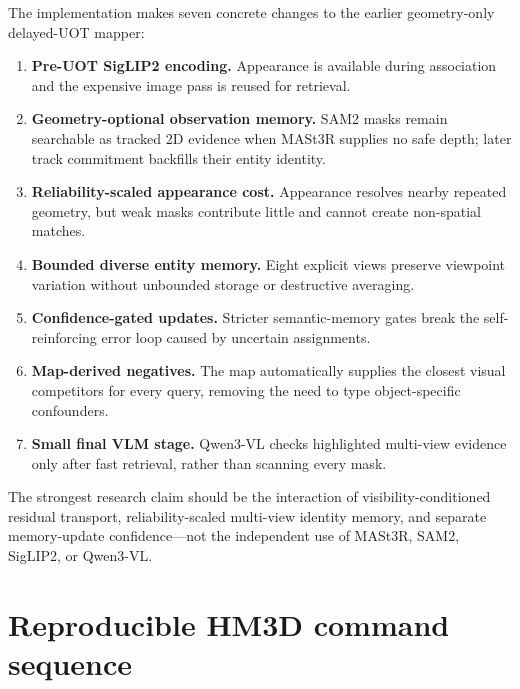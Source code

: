 \documentclass[11pt]{article}
\newcommand{\1}{\bm{1}}
\begin{document}
The implementation makes seven concrete changes to the earlier geometry-only
delayed-UOT mapper:
\begin{enumerate}[leftmargin=*]
    \item \textbf{Pre-UOT SigLIP2 encoding.} Appearance is available during
          association and the expensive image pass is reused for retrieval.
    \item \textbf{Geometry-optional observation memory.} SAM2 masks remain
          searchable as tracked 2D evidence when MASt3R supplies no safe depth;
          later track commitment backfills their entity identity.
    \item \textbf{Reliability-scaled appearance cost.} Appearance resolves
          nearby repeated geometry, but weak masks contribute little and cannot
          create non-spatial matches.
    \item \textbf{Bounded diverse entity memory.} Eight explicit views preserve
          viewpoint variation without unbounded storage or destructive averaging.
    \item \textbf{Confidence-gated updates.} Stricter semantic-memory gates break
          the self-reinforcing error loop caused by uncertain assignments.
    \item \textbf{Map-derived negatives.} The map automatically supplies the
          closest visual competitors for every query, removing the need to type
          object-specific confounders.
    \item \textbf{Small final VLM stage.} Qwen3-VL checks highlighted multi-view
          evidence only after fast retrieval, rather than scanning every mask.
\end{enumerate}

The strongest research claim should be the interaction of visibility-conditioned
residual transport, reliability-scaled multi-view identity memory, and separate
memory-update confidence---not the independent use of MASt3R, SAM2, SigLIP2, or
Qwen3-VL.

\section{Reproducible HM3D command sequence}
\end{document}

